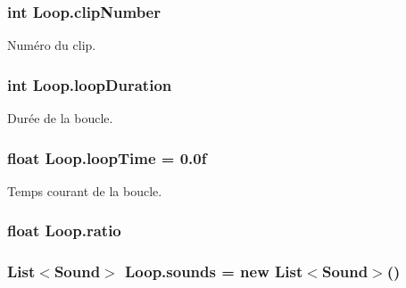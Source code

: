 \subsubsection[{clip\+Number}]{\setlength{\rightskip}{0pt plus 5cm}int Loop.\+clip\+Number\hspace{0.3cm}{\ttfamily [private]}}\label{class_loop_a00a7cf02a16a43e61c62856cd5d6b014}


Numéro du clip. 

\hypertarget{class_loop_a781c98a230f1e6d2e4f4a36d9c0a4a24}{}
\subsubsection[{loop\+Duration}]{\setlength{\rightskip}{0pt plus 5cm}int Loop.\+loop\+Duration\hspace{0.3cm}{\ttfamily [private]}}\label{class_loop_a781c98a230f1e6d2e4f4a36d9c0a4a24}


Durée de la boucle. 

\hypertarget{class_loop_ab6f3df1dceea6e92a1728d8ad3558f4b}{}
\subsubsection[{loop\+Time}]{\setlength{\rightskip}{0pt plus 5cm}float Loop.\+loop\+Time = 0.\+0f}\label{class_loop_ab6f3df1dceea6e92a1728d8ad3558f4b}


Temps courant de la boucle. 

\hypertarget{class_loop_a483ac8b940665a7661559d82b9f8b3e5}{}
\subsubsection[{ratio}]{\setlength{\rightskip}{0pt plus 5cm}float Loop.\+ratio\hspace{0.3cm}{\ttfamily [private]}}\label{class_loop_a483ac8b940665a7661559d82b9f8b3e5}
\hypertarget{class_loop_a36bc41b6866c834ca9b55ecb8c4c2a0f}{}
\subsubsection[{sounds}]{\setlength{\rightskip}{0pt plus 5cm}List$<${\bf Sound}$>$ Loop.\+sounds = new List$<${\bf Sound}$>$()}\label{class_loop_a36bc41b6866c834ca9b55ecb8c4c2a0f}


